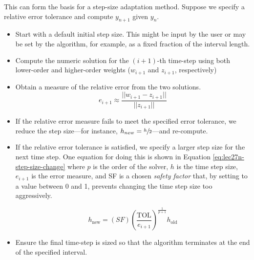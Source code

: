 This can form the basis for a step-size adaptation method.  Suppose we specify a relative error tolerance and compute $y_{n+1}$ given $y_n$.  
\begin{itemize}
\item Start with a default initial step size.  This might be input by the user or may be set by the algorithm, for example, as a fixed fraction of the interval length. 
\item Compute the numeric solution for the $(i+1)$-th time-step using both lower-order and higher-order weights ($w_{i+1}$ and $z_{i+1}$, respectively)
\item Obtain a measure of the relative error from the two solutions.
\begin{equation*}
e_{i+1} \approx \frac{||w_{i+1}-z_{i+1}||}{||z_{i+1}||}
\end{equation*}
\item If the relative error measure fails to meet the specified error tolerance, we reduce the step size---for instance, $h_{new} = \sfrac{h}{2}$---and re-compute.
\item If the relative error tolerance is satisfied, we specify a larger step size for the next time step. One equation for doing this is shown in Equation \ref{eq:lec27n-step-size-change} where $p$ is the order of the solver, $h$ is the time step size, $e_{i+1}$ is the error measure, and SF is a chosen \emph{safety factor} that, by setting to a value between 0 and 1, prevents changing the time step size too aggressively.\cite{sauer2011numerical}

\begin{equation}
h_{\text{new}}=(SF)\left(\frac{\text{TOL}}{e_{i+1}}\right)^{\frac{1}{p+1}}h_{\text{old}}
\label{eq:lec27n-step-size-change}
\end{equation}

\item Ensure the final time-step is sized so that the algorithm terminates at the end of the specified interval.

\end{itemize}

